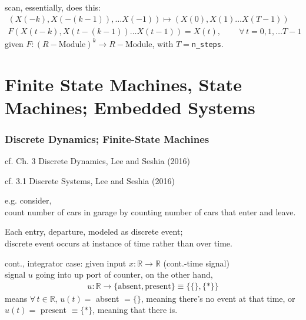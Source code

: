 \documentclass[10pt]{amsart}
\begin{document}
\begin{multicols*}{2}
scan, essentially, does this:
\begin{equation}
\begin{gathered}
  (X(-k),X(-(k-1)),\dots X(-1)) \mapsto (X(0),X(1)\dots X(T-1)) \\ 
F(X(t-k), X(t-(k-1))\dots X(t-1)) = X(t), \qquad \, \forall \, t=0,1,\dots T-1
  \end{gathered}
\end{equation}
given $F:(R-\text{Module})^k \to R-\text{Module}$, with $T=$\verb|n_steps|.  





\part{Finite State Machines, State Machines; Embedded Systems}  

\section{Discrete Dynamics; Finite-State Machines}  

cf. Ch. 3 Discrete Dynamics, Lee and Seshia (2016) \cite{LeSe2016}

cf. 3.1 Discrete Systems, Lee and Seshia (2016) \cite{LeSe2016}

e.g. consider,  \\
count number of cars in garage by counting number of cars that enter and leave.  

Each entry, departure, modeled as discrete event; \\
discrete event occurs at instance of time rather than over time.  

cont., integrator case: given input $x:\mathbb{R} \to \mathbb{R}$ (cont.-time signal) \\

signal $u$ going into up port of counter, on the other hand, 
\[
\begin{aligned}
	u : \mathbb{R} \to \lbrace \text{absent}, \text{present}  \rbrace \equiv \lbrace \lbrace \rbrace, \lbrace * \rbrace \rbrace 
\end{aligned}
\]
means $\forall \, t\in \mathbb{R}$, $u(t) = $ absent $= \lbrace \rbrace$, meaning there's no event at that time, or \\
$u(t) = $ present $\equiv \lbrace * \rbrace$, meaning that there is.  


\end{multicols*}
\end{document}
